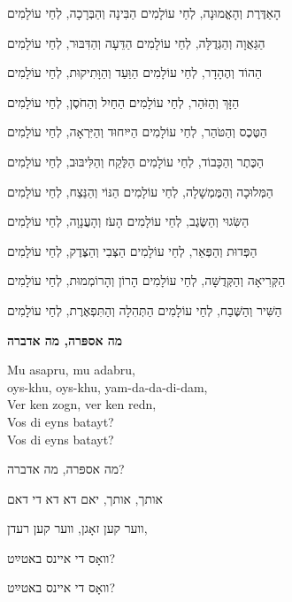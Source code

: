 הָאַדֶּרֶת וְהָאֱמוּנָה, לְחַי עוֹלָמִים
\hfill
הַבִּינָה וְהַבְּרָכָה, לְחַי עוֹלָמִים

הַגַּאֲוָה וְהַגְּדֻלָּה, לְחַי עוֹלָמִים
\hfill
הַדֵּעָה וְהַדִּבּוּר, לְחַי עוֹלָמִים

הַהוֹד וְהֶהָדָר, לְחַי עוֹלָמִים
\hfill
הַוַּעַד וְהַוָּתִיקוּת, לְחַי עוֹלָמִים

הַזָּךְ וְהַזֹּהַר, לְחַי עוֹלָמִים
\hfill
הַחַיִל וְהַחֹסֶן, לְחַי עוֹלָמִים

הַטֶּכֶס וְהַטֹּהַר, לְחַי עוֹלָמִים
\hfill
הַיּיִחוּד וְהַיִּרְאָה, לְחַי עוֹלָמִים

הַכֶּתֶר וְהַכָּבוֹד, לְחַי עוֹלָמִים
\hfill
הַלֶּקַח וְהַלִּיבּוּב, לְחַי עוֹלָמִים

הַמְּלוּכָה וְהַמֶּמְשָׁלָה, לְחַי עוֹלָמִים
\hfill
הַנּוֹי וְהַנֵּצַח, לְחַי עוֹלָמִים

הַשִּׂגוּי וְהַשֶּׂגֶב, לְחַי עוֹלָמִים
\hfill
הָעֹז וְהָעֲנָוָה, לְחַי עוֹלָמִים

הַפְּדוּת וְהַפְּאֵר, לְחַי עוֹלָמִים
\hfill
הַצְּבִי וְהַצֶּדֶק, לְחַי עוֹלָמִים

הַקְּרִיאָה וְהַקְּדֻשָּׁה, לְחַי עוֹלָמִים
\hfill
הָרוֹן וְהָרוֹמְמוּת, לְחַי עוֹלָמִים

הַשִּׁיר וְהַשֶּׁבַח, לְחַי עוֹלָמִים
\hfill
הַתְּהִלָה וְהַתִּפְאֶרֶת, לְחַי עוֹלָמִים

\break
\begin{center}
{\large \bfseries \textcolor{light-gray}{
מה אספּרה, מה אדברה
}}
\end{center}

\begin{minipage}{0.52\linewidth}
\begin{english}
Mu asapru, mu adabru, \\
oys-khu, oys-khu, yam-da-da-di-dam, \\
Ver ken zogn, ver ken redn, \\
Vos di eyns batayt? \\
Vos di eyns batayt?
\end{english}
\end{minipage} \hspace{0.02\linewidth}
\begin{minipage}{0.44\linewidth}
מה אספּרה, מה אדברה?

אותך, אותך, יאם דא דא די דאם

ווער קען זאָגן, ווער קען רעדן, 

וואָס די איינס באטײַט?

וואָס די איינס באטײַט?
\end{minipage}

